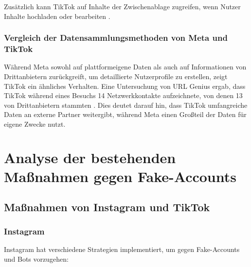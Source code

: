 \documentclass[12pt]{report}
\begin{document}
Zusätzlich kann TikTok auf Inhalte der Zwischenablage zugreifen, wenn Nutzer Inhalte hochladen oder bearbeiten \cite{erecht24}.

\subsection{Vergleich der Datensammlungsmethoden von Meta und TikTok}

Während Meta sowohl auf plattformeigene Daten als auch auf Informationen von Drittanbietern zurückgreift, um detaillierte Nutzerprofile zu erstellen, zeigt TikTok ein ähnliches Verhalten. Eine Untersuchung von URL Genius ergab, dass TikTok während eines Besuchs 14 Netzwerkkontakte aufzeichnete, von denen 13 von Drittanbietern stammten \cite{wuv2022}. Dies deutet darauf hin, dass TikTok umfangreiche Daten an externe Partner weitergibt, während Meta einen Großteil der Daten für eigene Zwecke nutzt.


\chapter{Analyse der bestehenden Maßnahmen gegen Fake-Accounts}
\section{Maßnahmen von Instagram und TikTok}
\subsection{Instagram}

Instagram hat verschiedene Strategien implementiert, um gegen Fake-Accounts und Bots vorzugehen:
\end{document}
